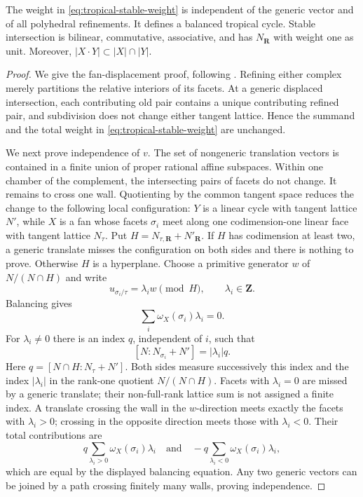 \begin{theorem}
\label{thm:tropical-stable-intersection}
The weight in \eqref{eq:tropical-stable-weight} is independent of the generic
vector and of all polyhedral refinements.  It defines a balanced tropical
cycle.  Stable intersection is bilinear, commutative, associative, and has
$N_{\mathbf R}$ with weight one as unit.  Moreover,
$|X\cdot Y|\subset |X|\cap|Y|$.
\end{theorem}
\begin{proof}
We give the fan-displacement proof, following
\cite[\S4.3]{MR18Tropical}.  Refining either complex merely partitions the
relative interiors of its facets.  At a generic displaced intersection,
each contributing old pair contains a unique contributing refined pair, and
subdivision does not change either tangent lattice.  Hence the summand and
the total weight in \eqref{eq:tropical-stable-weight} are unchanged.

We next prove independence of $v$.  The set of nongeneric translation
vectors is contained in a finite union of proper rational affine subspaces.
Within one chamber of the complement, the intersecting pairs of facets do
not change.  It remains to cross one wall.  Quotienting by the common tangent
space reduces the change to the following local configuration: $Y$ is a
linear cycle with tangent lattice $N'$, while $X$ is a fan whose facets
$\sigma_i$ meet along one codimension-one linear face with tangent lattice
$N_\tau$.  Put $H=N_{\tau,\mathbf R}+N'_{\mathbf R}$.  If $H$ has codimension
at least two, a generic translate misses the configuration on both sides and
there is nothing to prove.  Otherwise $H$ is a hyperplane.  Choose a
primitive generator $w$ of $N/(N\cap H)$ and write
\[
 u_{\sigma_i/\tau}=\lambda_iw\pmod H,
 \qquad \lambda_i\in\mathbf Z.
\]
Balancing gives
\[
                         \sum_i\omega_X(\sigma_i)\lambda_i=0.
\]
For $\lambda_i\neq0$ there is an index $q$, independent of $i$, such that
\[
 [N:N_{\sigma_i}+N']
 =|\lambda_i|q.
\]
Here $q=[N\cap H:N_\tau+N']$. Both sides measure successively this index
and the index $|\lambda_i|$ in the rank-one quotient $N/(N\cap H)$.
Facets with $\lambda_i=0$ are missed by a generic translate; their
non-full-rank lattice sum is not assigned a finite index. A translate crossing the wall in
the $w$-direction meets exactly the facets with $\lambda_i>0$; crossing in
the opposite direction meets those with $\lambda_i<0$.  Their total
contributions are
\[
 q\sum_{\lambda_i>0}\omega_X(\sigma_i)\lambda_i
 \quad\text{and}\quad
 -q\sum_{\lambda_i<0}\omega_X(\sigma_i)\lambda_i,
\]
which are equal by the displayed balancing equation.  Any two generic
vectors can be joined by a path crossing finitely many walls, proving
independence.


\end{proof}

